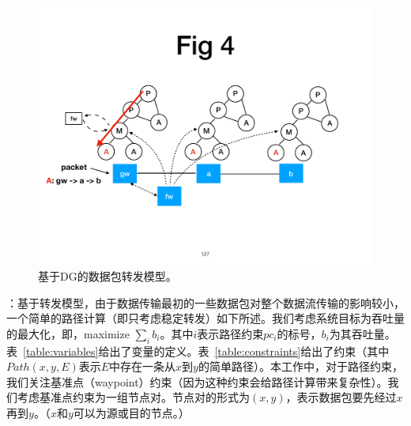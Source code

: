\begin{figure}[!htbp]
\centering
      \centering\includegraphics[width=\linewidth]{figures/ss-127.pdf}
\caption{基于DG的数据包转发模型。}
\label{fig:pfm-example}
\end{figure}

：基于转发模型，由于数据传输最初的一些数据包对整个数据流传输的影响较小，一个简单的路径计算（即只考虑稳定转发）如下所述。我们考虑系统目标为吞吐量的最大化，即，maximize $\sum_ib_i$。其中$i$表示路径约束$pc_i$的标号，$b_i$为其吞吐量。表~\ref{table:variables}给出了变量的定义。表~\ref{table:constraints}给出了约束（其中$Path(x, y, E)$表示$E$中存在一条从$x$到$y$的简单路径）。本工作中，对于路径约束，我们关注基准点（waypoint）约束（因为这种约束会给路径计算带来复杂性）。我们考虑基准点约束为一组节点对。节点对的形式为$(x, y)$，表示数据包要先经过$x$再到$y$。（$x$和$y$可以为源或目的节点。）


